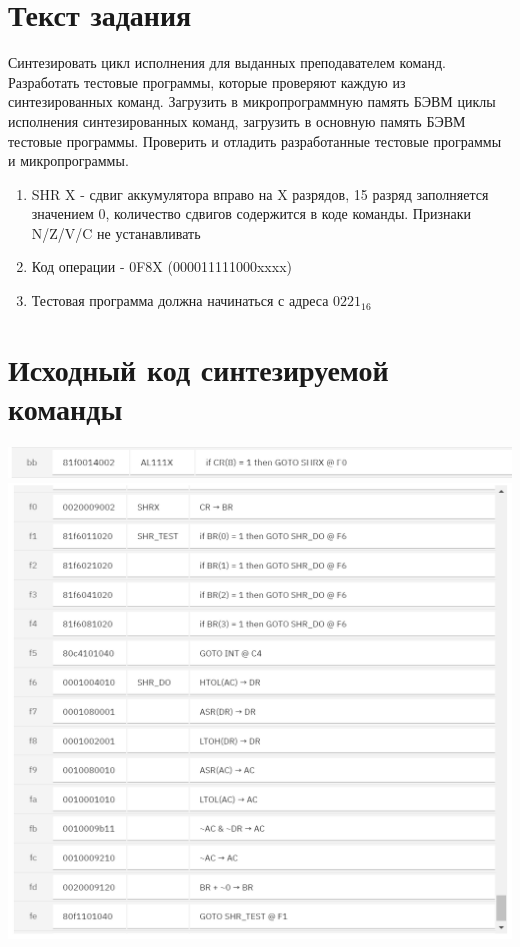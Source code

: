 \documentclass{article}
\begin{document}
\itmo[
  variant=129,
  labn=7,
  discipline=Основы профессиональной деятельности,
  group=P3115,
  student=Владимир Мацюк,
  teacher=Абузов Ярослав Александрович,
  logo=../../lib/img/itmo.png
]


\section{Текст задания}

Синтезировать цикл исполнения для выданных преподавателем команд. Разработать тестовые программы, которые проверяют каждую из синтезированных команд. Загрузить в микропрограммную память БЭВМ циклы исполнения синтезированных команд, загрузить в основную память БЭВМ тестовые программы. Проверить и отладить разработанные тестовые программы и микропрограммы.



\begin{enumerate}
  \item SHR X - сдвиг аккумулятора вправо на X разрядов, 15 разряд заполняется значением 0, количество сдвигов содержится в коде команды. Признаки N/Z/V/C не устанавливать
  \item Код операции - 0F8X (000011111000xxxx)
  \item Тестовая программа должна начинаться с адреса $0221_{16}$
\end{enumerate}

\section{Исходный код синтезируемой команды}

\begin{center}
  \includegraphics{1.png}
  \includegraphics{2.png}
\end{center}
\end{document}

